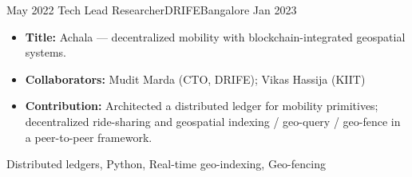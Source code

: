 \begin{experiences}
\experience
    {May 2022}   {Tech Lead Researcher}{DRIFE}{Bangalore}
    {Jan 2023} {
                     \begin{itemize}
                        \item \textbf{Title:} Achala --- decentralized mobility with blockchain-integrated geospatial systems.
                        \item \textbf{Collaborators:} Mudit Marda (CTO, DRIFE); Vikas Hassija (KIIT)
                        \item \textbf{Contribution:} Architected a distributed ledger for mobility primitives; decentralized ride-sharing and geospatial indexing / geo-query / geo-fence in a peer-to-peer framework.
                    \end{itemize}
                    }
                    {Distributed ledgers, Python, Real-time geo-indexing, Geo-fencing}

\end{experiences}
